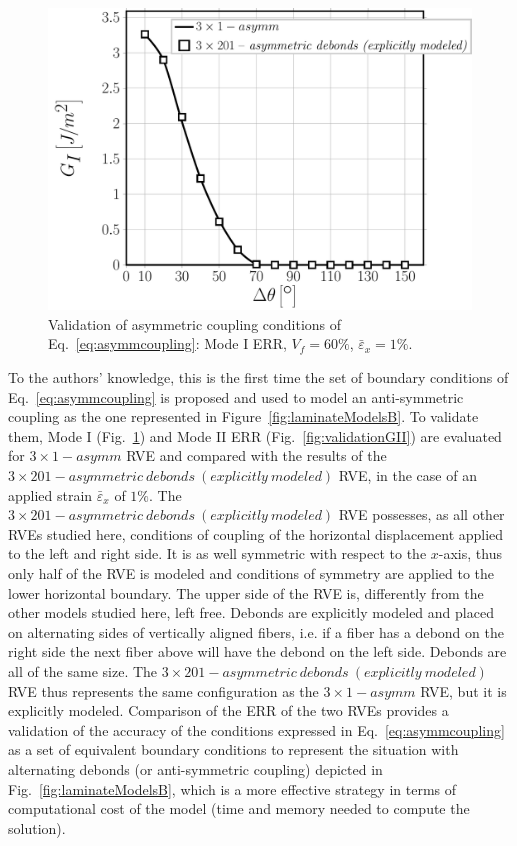 \documentclass[smallextended]{svjour3}       %
\begin{document}
\begin{figure}[!h]
\centering
\includegraphics[width=\textwidth]{asymm-vs-explmodel-vf60-GI.pdf}
\caption{Validation of asymmetric coupling conditions of Eq.~\ref{eq:asymmcoupling}: Mode I ERR, $V_{f}=60\%$, $\bar{\varepsilon}_{x}=1\%$.}\label{fig:validationGI}
\end{figure}

To the authors' knowledge, this is the first time the set of boundary conditions of Eq.~\ref{eq:asymmcoupling} is proposed and used to model an anti-symmetric coupling as the one represented in Figure~\ref{fig:laminateModelsB}. To validate them, Mode I (Fig.~\ref{fig:validationGI}) and Mode II ERR (Fig.~\ref{fig:validationGII}) are evaluated for $3\times 1-asymm$ RVE and compared with the results of the $3\times201-asymmetric\ debonds\ (explicitly\ modeled)$ RVE, in the case of an applied strain $\bar{\varepsilon}_{x}$ of $1\%$. The $3\times201-asymmetric\ debonds\ (explicitly\ modeled)$ RVE possesses, as all other RVEs studied here, conditions of coupling of the horizontal displacement applied to the left and right side. It is as well symmetric with respect to the $x$-axis, thus only half of the RVE is modeled and conditions of symmetry are applied to the lower horizontal boundary. The upper side of the RVE is, differently from the other models studied here, left free. Debonds are explicitly modeled and placed on alternating sides of vertically aligned fibers, i.e. if a fiber has a debond on the right side the next fiber above will have the debond on the left side. Debonds are all of the same size. The $3\times201-asymmetric\ debonds\ (explicitly\ modeled)$ RVE thus represents the same configuration as the $3\times 1-asymm$ RVE, but it is explicitly modeled. Comparison of the ERR of the two RVEs provides a validation of the accuracy of the conditions expressed in Eq.~\ref{eq:asymmcoupling} as a set of equivalent boundary conditions to represent the situation with alternating debonds (or anti-symmetric coupling) depicted in Fig.~\ref{fig:laminateModelsB}, which is a more effective strategy in terms of computational cost of the model (time and memory needed to compute the solution).
\end{document}
